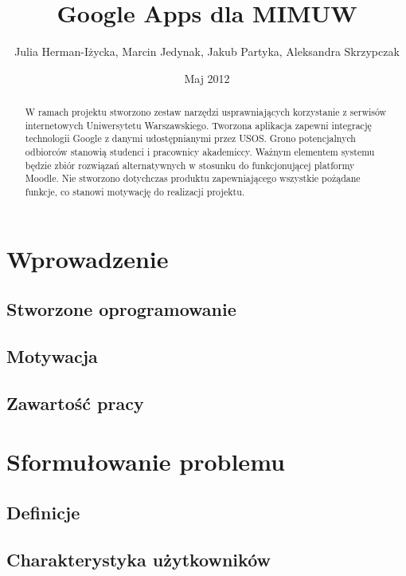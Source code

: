 \documentclass{pracamgr}
\author{Julia Herman-Iżycka, Marcin Jedynak, Jakub Partyka, Aleksandra Skrzypczak}
\title{Google Apps dla MIMUW}
\date{Maj 2012}
\begin{document}
\maketitle

\begin{abstract}
W ramach projektu stworzono zestaw narzędzi usprawniających korzystanie 
z serwisów internetowych Uniwersytetu Warszawskiego. Tworzona aplikacja zapewni integrację 
technologii Google z danymi udostępnianymi przez USOS. Grono potencjalnych odbiorców stanowią 
studenci i pracownicy akademiccy. Ważnym elementem systemu będzie zbiór rozwiązań 
alternatywnych w stosunku do funkcjonującej platformy Moodle. Nie stworzono dotychczas 
produktu zapewniającego wszystkie pożądane funkcje, co stanowi motywację do realizacji projektu. 
\end{abstract}

\tableofcontents

\chapter*{Wprowadzenie}

\section{Stworzone oprogramowanie}
\section{Motywacja}
\section{Zawartość pracy}

\chapter{Sformułowanie problemu}
\section{Definicje}
\section{Charakterystyka użytkowników}
\end{document}
